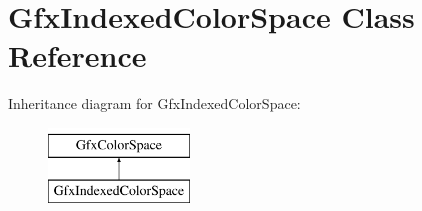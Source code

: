 \hypertarget{class_gfx_indexed_color_space}{}\section{Gfx\+Indexed\+Color\+Space Class Reference}
\label{class_gfx_indexed_color_space}
Inheritance diagram for Gfx\+Indexed\+Color\+Space\+:\begin{figure}[H]
\begin{center}
\leavevmode
\includegraphics[height=2.000000cm]{class_gfx_indexed_color_space}
\end{center}
\end{figure}
